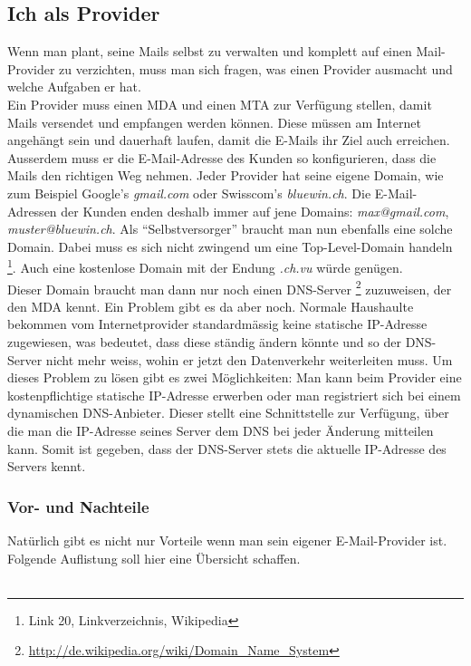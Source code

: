 \subsection{Ich als Provider}
Wenn man plant, seine Mails selbst zu verwalten und komplett auf einen Mail-Provider zu verzichten, muss man sich fragen, was einen Provider ausmacht und welche Aufgaben er hat. 
\\
Ein Provider muss einen MDA und einen MTA zur Verfügung stellen, damit Mails versendet und empfangen werden können. Diese müssen am Internet angehängt sein und dauerhaft laufen, damit die E-Mails ihr Ziel auch erreichen.
\\
Ausserdem muss er die E-Mail-Adresse des Kunden so konfigurieren, dass die Mails den richtigen Weg nehmen. Jeder Provider hat seine eigene Domain, wie zum Beispiel Google's \textit{gmail.com} oder Swisscom's \textit{bluewin.ch}. Die E-Mail-Adressen der Kunden enden deshalb immer auf jene Domains: \textit{max@gmail.com}, \textit{muster@bluewin.ch}. Als ``Selbstversorger'' braucht man nun ebenfalls eine solche Domain. Dabei muss es sich nicht zwingend um eine Top-Level-Domain handeln \footnote{Link 20, Linkverzeichnis, Wikipedia}. Auch eine kostenlose Domain mit der Endung \textit{.ch.vu} würde genügen.
\\
Dieser Domain braucht man dann nur noch einen DNS-Server \footnote{\url{http://de.wikipedia.org/wiki/Domain\_Name\_System}} zuzuweisen, der den MDA kennt.
Ein Problem gibt es da aber noch. Normale Haushaulte bekommen vom Internetprovider standardmässig keine statische IP-Adresse zugewiesen, was bedeutet, dass diese ständig ändern könnte und so der DNS-Server nicht mehr weiss, wohin er jetzt den Datenverkehr weiterleiten muss. Um dieses Problem zu lösen gibt es zwei Möglichkeiten: Man kann beim Provider eine kostenpflichtige statische IP-Adresse erwerben oder man registriert sich bei einem dynamischen DNS-Anbieter. Dieser stellt eine Schnittstelle zur Verfügung, über die man die IP-Adresse seines Server dem DNS bei jeder Änderung mitteilen kann. Somit ist gegeben, dass der DNS-Server stets die aktuelle IP-Adresse des Servers kennt.

\subsubsection{Vor- und Nachteile}
Natürlich gibt es nicht nur Vorteile wenn man sein eigener E-Mail-Provider ist. Folgende Auflistung soll hier eine Übersicht schaffen. \\ \\

